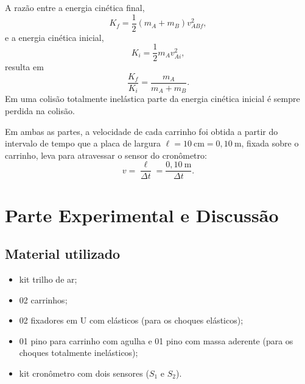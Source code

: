 \documentclass[12pt,a4paper]{article}
\begin{document}
A razão entre a energia cinética final,
\begin{equation}
\label{eq:kf}
K_f = \frac{1}{2}\left(m_A + m_B\right)v_{ABf}^2,
\end{equation}
e a energia cinética inicial,
\begin{equation}
\label{eq:ki}
K_i = \frac{1}{2}m_A v_{Ai}^2,
\end{equation}
resulta em
\begin{equation}
\label{eq:razao}
\frac{K_f}{K_i} = \frac{m_A}{m_A + m_B}.
\end{equation}
Em uma colisão totalmente inelástica parte da energia cinética inicial é sempre perdida na
colisão.

Em ambas as partes, a velocidade de cada carrinho foi obtida a partir do intervalo de tempo que a
placa de largura $\ell = 10~\mathrm{cm} = 0{,}10~\mathrm{m}$, fixada sobre o carrinho, leva para
atravessar o sensor do cronômetro:
\begin{equation}
\label{eq:vel}
v = \frac{\ell}{\Delta t} = \frac{0{,}10~\mathrm{m}}{\Delta t}.
\end{equation}


\section{Parte Experimental e Discussão}

\subsection{Material utilizado}
\begin{itemize}
	\item kit trilho de ar;
	\item 02 carrinhos;
	\item 02 fixadores em U com elásticos (para os choques elásticos);
	\item 01 pino para carrinho com agulha e 01 pino com massa aderente (para os choques
	totalmente inelásticos);
	\item kit cronômetro com dois sensores ($S_1$ e $S_2$).
\end{itemize}
\end{document}
